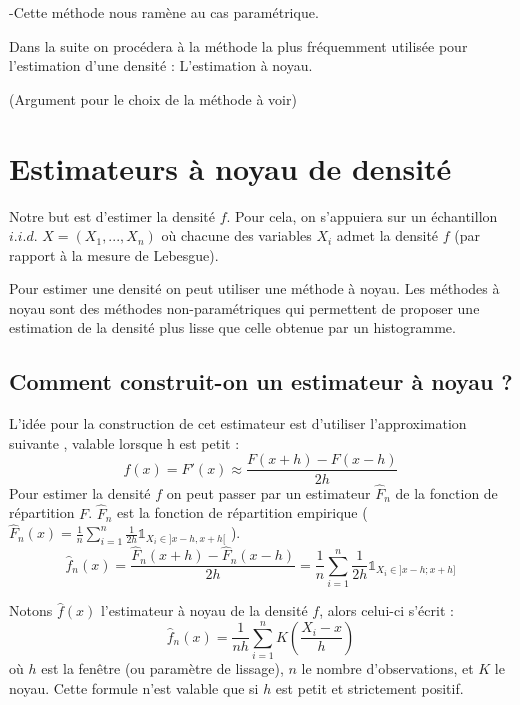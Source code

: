 \documentclass[
]{book}
\begin{document}
\begin{rem}
-Cette méthode nous ramène au cas paramétrique.\newline
\end{rem}

Dans la suite on procédera à la méthode la plus fréquemment utilisée pour l'estimation d'une densité : L'estimation à noyau.\newline 

(Argument pour le choix de la méthode à voir)

\hypertarget{estimateurs-uxe0-noyau-de-densituxe9}{%
\section{Estimateurs à noyau de densité}\label{estimateurs-uxe0-noyau-de-densituxe9}}

Notre but est d'estimer la densité \(f\). Pour cela, on s'appuiera sur un échantillon \(i.i.d.\) \(X= (X_1,...,X_n)\) où chacune des variables \(X_i\) admet la densité \(f\) (par rapport à la mesure de Lebesgue).

Pour estimer une densité on peut utiliser une méthode à noyau.
Les méthodes à noyau sont des méthodes non-paramétriques qui permettent de proposer une estimation de la densité plus lisse que celle obtenue par un histogramme.

\hypertarget{comment-construit-on-un-estimateur-uxe0-noyau}{%
\subsection{Comment construit-on un estimateur à noyau ?}\label{comment-construit-on-un-estimateur-uxe0-noyau}}

L'idée pour la construction de cet estimateur est d'utiliser l'approximation suivante , valable lorsque h est petit :\\
\[
f(x) = F'(x)\approx \frac{F(x+h)-F(x-h)}{2h}
\]
Pour estimer la densité \(f\) on peut passer par un estimateur \(\hat F_n\) de la fonction de répartition \(F\). \(\hat F_n\) est la fonction de répartition empirique ( \(\hat F_n(x)= \frac1n \sum\limits_{i=1}^n\frac{1}{2h} \mathds1_{X_i \in ]x-h, x+h[}\) ).
\[
\hat f_n(x)= \frac{\hat F_n(x+h)-\hat F_n(x-h)}{2h} = \frac 1n \sum\limits_{i=1}^n \frac1{2h} \mathds1_{X_i \in ]x-h;x+h]}
\]

Notons \(\hat f(x)\) l'estimateur à noyau de la densité \(f\), alors celui-ci s'écrit :
\[
\hat f_n(x) = \frac1{nh} \sum\limits_{i=1}^n K\left(\frac{X_i-x}h\right)
\]
où \(h\) est la fenêtre (ou paramètre de lissage), \(n\) le nombre d'observations, et \(K\) le noyau.
Cette formule n'est valable que si \(h\) est petit et strictement positif.
\end{document}
